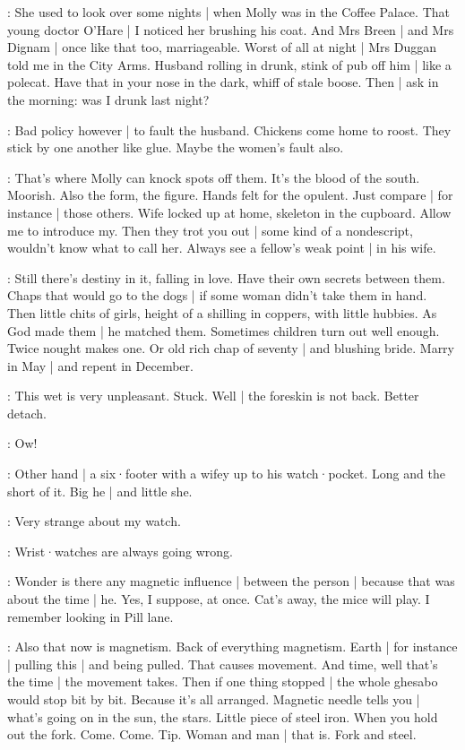 \BloomHist:
She used to look over some nights |
when Molly was in the Coffee Palace.
That young doctor O'Hare |
I noticed her brushing his coat.
And Mrs Breen |
and Mrs Dignam |
once like that too,
marriageable.
Worst of all at night |
Mrs Duggan told me in the City Arms.
Husband rolling in drunk,
stink of pub off him |
like a polecat.
Have that in your nose in the dark,
whiff of stale boose.
Then |
ask in the morning:
was I drunk last night?

\BloomAbstract:
Bad policy however |
to fault the husband.
Chickens come home to roost.
They stick by one another like glue.
Maybe the women's fault also.

\BloomHist:
That's where Molly can knock spots off them.
It's the blood of the south.
Moorish.
Also the form,
the figure.
Hands felt for the opulent.
Just compare |
for instance |
those others.%
Wife locked up at home,
skeleton in the cupboard.
Allow me to introduce my.
Then they trot you out |
some kind of a nondescript,
wouldn't know what to call her.
Always see a fellow's weak point |
in his wife.

\BloomAbstract:
Still there's destiny in it,
falling in love.
Have their own secrets between them.
Chaps that would go to the dogs |
if some woman didn't take them in hand.
Then little chits of girls,
height of a shilling in coppers,
with little hubbies.
As God made them |
he matched them.
Sometimes children turn out well enough.
Twice nought makes one.
Or old rich chap of seventy |
and blushing bride.
Marry in May |
and repent in December.

\BloomCurrent:
This wet is very unpleasant.
Stuck.
Well |
the foreskin is not back.
Better detach.%

\BloomInt:
Ow!

\BloomAbstract:
Other hand |
a six·footer with a wifey up to his watch·pocket.
Long and the short of it.
Big he |
and little she.

\BloomToday:
Very strange about my watch.

\BloomAbstract:
Wrist·watches are always going wrong.

\BloomToday:
Wonder is there any magnetic influence |
between the person |
because that was about the time |
he.
Yes,
I suppose,
at once.
Cat's away,
the mice will play.
I remember looking in Pill lane.

\BloomAbstract:
Also that now is magnetism.
Back of everything magnetism.
Earth |
for instance |
pulling this |
and being pulled.
That causes movement.
And time,
well that's the time |
the movement takes.
Then if one thing stopped |
the whole ghesabo would stop bit by bit.%
Because it's all arranged.
Magnetic needle tells you |
what's going on in the sun,
the stars.
Little piece of steel iron.
When you hold out the fork.
Come.
Come.
Tip.
Woman and man |
that is.
Fork and steel.

